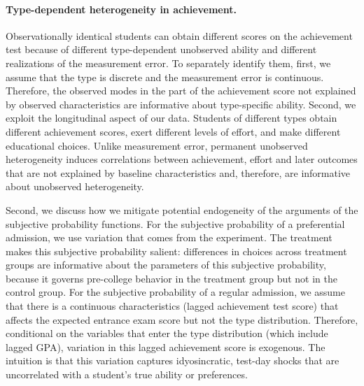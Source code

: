 \paragraph{Type-dependent heterogeneity in achievement.} Observationally identical students can obtain different scores on the achievement test because of different type-dependent unobserved ability and different realizations of the measurement error. To separately identify them, first, we assume that the type is discrete and the measurement error is continuous. Therefore, the observed modes in the part of the achievement score not explained by observed characteristics are informative about type-specific ability. Second, we exploit the longitudinal aspect of our data. Students of different types obtain different achievement scores, exert different levels of effort, and make different educational choices. Unlike measurement error, permanent unobserved heterogeneity induces correlations between achievement, effort and later outcomes that are not explained by baseline characteristics and, therefore, are informative about unobserved heterogeneity.\par 

Second, we discuss how we mitigate potential endogeneity of the arguments of the subjective probability functions. For the subjective probability of a preferential admission, we use variation that comes from the experiment. The treatment makes this subjective probability salient: differences in choices across treatment groups are informative about the parameters of this subjective probability, because it governs pre-college behavior in the treatment group but not in the control group. For the subjective probability of a regular admission, we assume that there is a continuous characteristics (lagged achievement test score) that affects the expected entrance exam score but not the type distribution. Therefore, conditional on the variables that enter the type distribution (which include lagged GPA), variation in this lagged achievement score is exogenous. The intuition is that this variation captures idyosincratic, test-day shocks that are uncorrelated with a student's true ability or preferences. 


